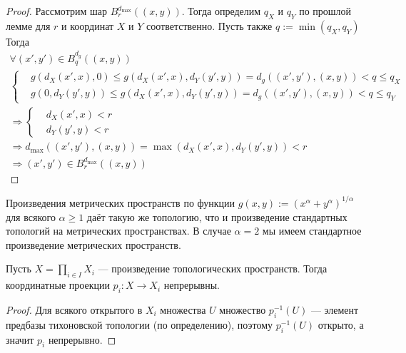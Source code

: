 \documentclass[12pt,a4paper]{article}
\begin{document}
\begin{proof}
        Рассмотрим шар $B_r^{d_{\max}}((x, y))$. Тогда определим $q_X$ и $q_Y$ по прошлой лемме для $r$ и координат $X$ и $Y$ соответственно. Пусть также $q := \min(q_X, q_Y)$ Тогда
        \begin{multline*}
            \forall (x', y') \in B_q^{d_g}((x, y))\\
                \left\{
                    \begin{aligned}
                        &g(d_X(x', x), 0) \leqslant g(d_X(x', x), d_Y(y', y)) = d_g((x', y'), (x, y)) < q \leqslant q_X\\
                        &g(0, d_Y(y', y)) \leqslant g(d_X(x', x), d_Y(y', y)) = d_g((x', y'), (x, y)) < q \leqslant q_Y
                    \end{aligned}
                \right.\\
            \Longrightarrow
            \left\{
                \begin{aligned}
                    &d_X(x', x) < r\\
                    &d_Y(y', y) < r
                \end{aligned}
            \right.\\
            \Longrightarrow d_{\max}((x', y'), (x, y)) = \max(d_X(x', x), d_Y(y', y)) < r\\
            \Longrightarrow (x', y') \in B_r^{d_{\max}}((x, y))
        \end{multline*}
    \end{proof}

    \begin{corollary}
        Произведения метрических пространств по функции $g(x, y) := (x^\alpha + y^\alpha)^{1/\alpha}$ для всякого $\alpha \geqslant 1$ даёт такую же топологию, что и произведение стандартных топологий на метрических пространствах. В случае $\alpha = 2$ мы имеем стандартное произведение метрических пространств.
    \end{corollary}

    \begin{theorem}
        Пусть $X = \prod_{i \in I} X_i$ --- произведение топологических пространств. Тогда координатные проекции $p_i: X \to X_i$ непрерывны.
    \end{theorem}

    \begin{proof}
        Для всякого открытого в $X_i$ множества $U$ множество $p_i^{-1}(U)$ --- элемент предбазы тихоновской топологии (по определению), поэтому $p_i^{-1}(U)$ открыто, а значит $p_i$ непрерывно.
    \end{proof}
\end{document}
